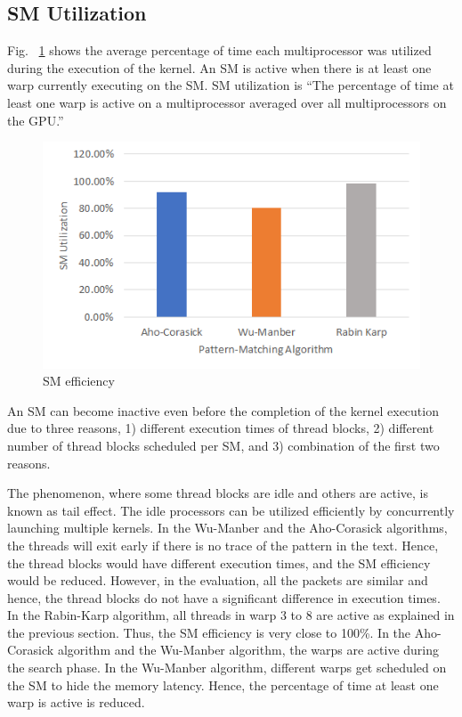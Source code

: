 \subsection{SM Utilization}

Fig. ~\ref{fig:smefficiency} shows the average percentage of time each multiprocessor was utilized during the execution of the kernel. An SM is active when there is at least one warp currently executing on the SM. SM utilization is “The percentage of time at least one warp is active on a multiprocessor averaged over all multiprocessors on the GPU.”

\begin{figure}[H]
	\centering
	\includegraphics[width=12cm]{smefficiency.png}
	\caption{SM efficiency}
	\label{fig:smefficiency}
\end{figure}
\squeezeup

An SM can become inactive even before the completion of the kernel execution due to three reasons, 1) different execution times of thread blocks, 2) different number of thread blocks scheduled per SM, and 3) combination of the first two reasons.
  
The phenomenon, where some thread blocks are idle and others are active, is known as tail effect. The idle processors can be utilized efficiently by concurrently launching multiple kernels.
In the Wu-Manber and the Aho-Corasick algorithms, the threads will exit early if there is no trace of the pattern in the text. Hence, the thread blocks would have different execution times, and the SM efficiency would be reduced. However, in the evaluation, all the packets are similar and hence, the thread blocks do not have a significant difference in execution times. In the Rabin-Karp algorithm, all threads in warp 3 to 8 are active as explained in the previous section. Thus, the SM efficiency is very close to 100\%. In the Aho-Corasick algorithm and the Wu-Manber algorithm, the warps are active during the search phase. In the Wu-Manber algorithm, different warps get scheduled on the SM to hide the memory latency. Hence, the percentage of time at least one warp is active is reduced.

